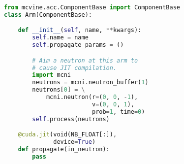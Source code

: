 \begin{lstlisting}[language=python]
from mcvine.acc.ComponentBase import ComponentBase
class Arm(ComponentBase):

    def __init__(self, name, **kwargs):
        self.name = name
        self.propagate_params = ()

        # Aim a neutron at this arm to
        # cause JIT compilation.
        import mcni
        neutrons = mcni.neutron_buffer(1)
        neutrons[0] = \
            mcni.neutron(r=(0, 0, -1),
                         v=(0, 0, 1),
                         prob=1, time=0)
        self.process(neutrons)

    @cuda.jit(void(NB_FLOAT[:]),
              device=True)
    def propagate(in_neutron):
        pass
\end{lstlisting}
